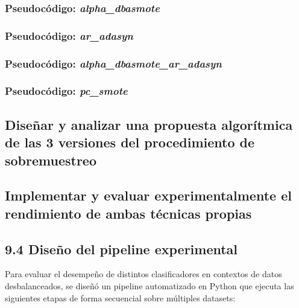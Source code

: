 \documentclass[12pt,a4paper]{article}
\begin{document}
\subsubsection{Pseudocódigo: \textit{alpha\_dbasmote}}


\subsubsection{Pseudocódigo: \textit{ar\_adasyn}}


\subsubsection{Pseudocódigo: \textit{alpha\_dbasmote\_ar\_adasyn}}


\subsubsection{Pseudocódigo: \textit{pc\_smote}}


\subsection{Diseñar y analizar una propuesta algorítmica de las 3 versiones del procedimiento de sobremuestreo}

\subsection{Implementar y evaluar experimentalmente el rendimiento de ambas técnicas propias}


\subsection{9.4 Diseño del pipeline experimental}
\label{sec:pipeline_experimental}

Para evaluar el desempeño de distintos clasificadores en contextos de datos desbalanceados, se diseñó un pipeline automatizado en Python que ejecuta las siguientes etapas de forma secuencial sobre múltiples datasets:
\end{document}
